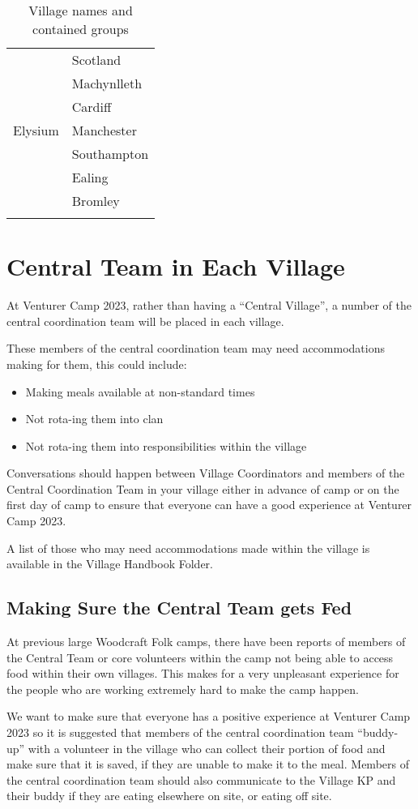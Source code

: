 \documentclass[a4paper, 11pt]{report}
\begin{document}
{\begin{longtable}{p{} p{}}
        \multirow{7}{*}{Elysium} & Scotland\\*
        & Machynlleth \\*
        & Cardiff \\*
        & Manchester \\*
        & Southampton \\*
        & Ealing \\*
        & Bromley \\
        \hline

\caption{Village names and contained groups}
\end{longtable}
}

\section{Central Team in Each Village}
At Venturer Camp 2023, rather than having a ``Central Village'', a number of the central coordination team will be placed in each village.\nl

These members of the central coordination team may need accommodations making for them, this could include:
\begin{itemize}
    \item Making meals available at non-standard times
    \item Not rota-ing them into clan
    \item Not rota-ing them into responsibilities within the village
\end{itemize}
Conversations should happen between Village Coordinators and members of the Central Coordination Team in your village either in advance of camp or on the first day of camp to ensure that everyone can have a good experience at Venturer Camp 2023.\nl

A list of those who may need accommodations made within the village is available in the Village Handbook Folder.

\subsection{Making Sure the Central Team gets Fed}
At previous large Woodcraft Folk camps, there have been reports of members of the Central Team or core volunteers within the camp not being able to access food within their own villages. This makes for a very unpleasant experience for the people who are working extremely hard to make the camp happen.\nl

We want to make sure that everyone has a positive experience at Venturer Camp 2023 so it is suggested that members of the central coordination team ``buddy-up'' with a volunteer in the village who can collect their portion of food and make sure that it is saved, if they are unable to make it to the meal. Members of the central coordination team should also communicate to the Village KP and their buddy if they are eating elsewhere on site, or eating off site. 
\end{document}
